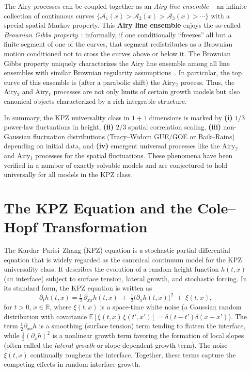\documentclass[letterpaper,11pt,oneside,reqno]{article}
\numberwithin{equation}{section}
\theoremstyle{definition}
\begin{document}
The Airy processes can be coupled together as an \emph{Airy line ensemble} – an infinite collection of continuous curves $\{\mathcal{A}_1(x) > \mathcal{A}_2(x) > \mathcal{A}_3(x) > \cdots\}$ with a special spatial Markov property. This \textbf{Airy line ensemble} enjoys the so-called \emph{Brownian Gibbs property} \cite{CorwinHammond2013}: informally, if one conditionally “freezes” all but a finite segment of one of the curves, that segment redistributes as a Brownian motion conditioned not to cross the curves above or below it. The Brownian Gibbs property uniquely characterizes the Airy line ensemble among all line ensembles with similar Brownian regularity assumptions \cite{AggarwalHuang2023Characterization}. In particular, the top curve of this ensemble is (after a parabolic shift) the Airy$_2$ process. Thus, the Airy$_2$ and Airy$_1$ processes are not only limits of certain growth models but also canonical objects characterized by a rich integrable structure.

In summary, the KPZ universality class in $1+1$ dimensions is marked by \textbf{(i)} $1/3$ power-law fluctuations in height, \textbf{(ii)} $2/3$ spatial correlation scaling, \textbf{(iii)} non-Gaussian fluctuation distributions (Tracy–Widom GUE/GOE or Baik–Rains) depending on initial data, and \textbf{(iv)} emergent universal processes like the Airy$_2$ and Airy$_1$ processes for the spatial fluctuations. These phenomena have been verified in a number of exactly solvable models and are conjectured to hold universally for all models in the KPZ class.

\section{The KPZ Equation and the Cole--Hopf Transformation}
The Kardar–Parisi–Zhang (KPZ) equation is a stochastic partial differential equation that is widely regarded as the canonical continuum model for the KPZ universality class. It describes the evolution of a random height function $h(t,x)$ (an interface) subject to surface tension, lateral growth, and stochastic forcing. In its standard form, the KPZ equation is written as
\begin{equation}\label{eq:KPZ}
\partial_t h(t,x) = \tfrac{1}{2}\,\partial_{xx} h(t,x)\;+\; \tfrac{1}{2}\big(\partial_x h(t,x)\big)^2 \;+\; \xi(t,x),
\end{equation}
for $t>0$, $x\in\mathbb{R}$, where $\xi(t,x)$ is a space-time white noise (a Gaussian random distribution with covariance $\mathbb{E}[\xi(t,x)\,\xi(t',x')] = \delta(t-t')\delta(x-x')$). The term $\frac{1}{2}\partial_{xx}h$ is a smoothing (surface tension) term tending to flatten the interface, while $\frac{1}{2}(\partial_x h)^2$ is a nonlinear growth term favoring the formation of local slopes (often called the \emph{lateral growth} or slope-dependent growth term). The noise $\xi(t,x)$ continually roughens the interface. Together, these terms capture the competing effects in random interface growth.
\end{document}

